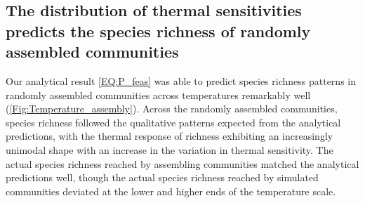 \documentclass{article}
\begin{document}
\subsection*{The distribution of thermal sensitivities predicts the species richness of randomly assembled communities}

Our analytical result \cref{EQ:P_feas} was able to predict species richness patterns in randomly assembled communities across temperatures remarkably well (\cref{Fig:Temperature_assembly}). Across the randomly assembled communities, species richness followed the qualitative patterns expected from the analytical predictions, with the thermal response of richness exhibiting an increasingly unimodal shape with an increase in the variation in thermal sensitivity. The actual species richness reached by assembling communities matched the analytical predictions well, though the actual species richness reached by simulated communities deviated at the lower and higher ends of the temperature scale. 
\end{document}
